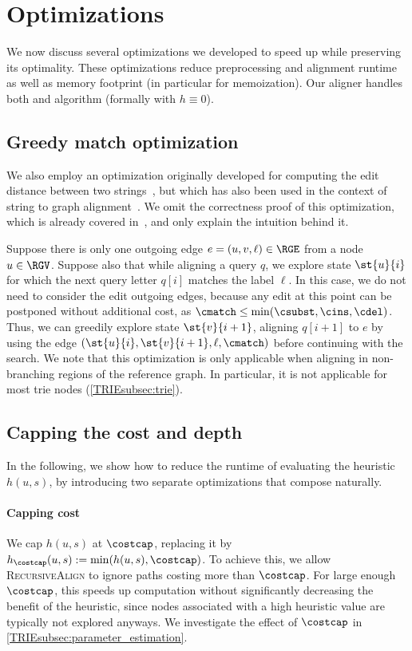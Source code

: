 \section{Optimizations} \label{TRIEsec:optimizations}

We now discuss several optimizations we developed to speed up \astarix while
preserving its optimality. These optimizations reduce preprocessing and
alignment runtime as well as memory footprint (in particular for memoization).
Our aligner \astarix handles both \A and \dijkstra algorithm (formally with $h
\equiv 0$).

\subsection{Greedy match optimization} \label{TRIEsubsec:greedy}
We also employ an optimization originally developed for computing the edit
distance between two strings~\cite{sellers_algorithm_1974,allison_lazy_1992}, but
which has also been used in the context of string to graph
alignment~\cite{dox2018efficient}. We omit the correctness proof of this
optimization, which is already covered
in~\cite{sellers_algorithm_1974}, and only explain the intuition behind it.

Suppose there is only one outgoing edge $e = (u, v, \ell) \in \RGE$ from a node
$u \in \RGV$. Suppose also that while aligning a query $q$, we explore state
$\st{u}{i}$ for which the next query letter $q[i]$ matches the label $\ell$. In
this case, we do not need to consider the edit outgoing edges, because
any edit at this point can be postponed without additional cost, as $\cmatch
\leq \min(\csubst, \cins, \cdel)$. Thus, we can greedily explore state
$\st{v}{i+1}$, aligning $q[i+1]$ to $e$ by using the edge $(\st{u}{i},
\st{v}{i+1}, \ell, \cmatch)$ before continuing with the \A search.
We note that this optimization is only applicable when aligning in non-branching
regions of the reference graph. In particular, it is not applicable for most
trie nodes (\cref{TRIEsubsec:trie}).

\subsection{Capping the cost and depth} \label{TRIEsubsec:speedup-heuristic}
In the following, we show how to reduce the runtime of evaluating the heuristic
$h(u,s)$, by introducing two separate optimizations that compose naturally.

\paragraph{Capping cost} We cap $h(u,s)$ at $\costcap$, replacing it by
$h_{\costcap}(u,s):=\min(h(u,s),\costcap)$. To achieve this, we allow
\textsc{RecursiveAlign} to ignore paths costing more than $\costcap$.
%
For large enough $\costcap$, this speeds up computation without significantly
decreasing the benefit of the heuristic, since nodes associated with a high
heuristic value are typically not explored anyways. We investigate the effect of
$\costcap$ in \cref{TRIEsubsec:parameter_estimation}.

